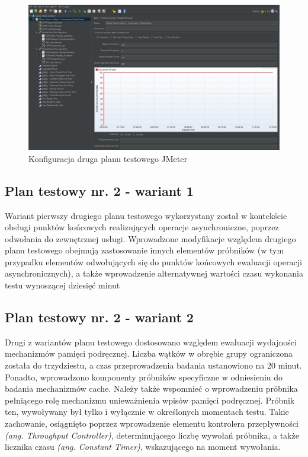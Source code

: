 \begin{figure}[ht]
    \centering
     \includegraphics[width=\linewidth]{rys04/test-plan-2.png}
    \caption{Konfiguracja druga planu testowego JMeter}
    \label{fig:test-plan-2}
\end{figure}

\subsection*{Plan testowy nr. 2 - wariant 1}
\label{plan-testowy-2-wariant-1}
Wariant pierwszy drugiego planu testowego wykorzystany został w kontekście obsługi punktów końcowych realizujących operacje asynchroniczne, poprzez odwołania do zewnętrznej usługi. Wprowadzone modyfikacje względem drugiego planu testowego obejmują zastosowanie innych elementów próbników (w tym przypadku elementów odwołujących się do punktów końcowych ewaluacji operacji asynchronicznych), a także wprowadzenie alternatywnej wartości czasu wykonania testu wynoszącej dziesięć minut

\subsection*{Plan testowy nr. 2 - wariant 2}
\label{plan-testowy-2-wariant-2}
Drugi z wariantów planu testowego dostosowano względem ewaluacji wydajności mechanizmów pamięci podręcznej. Liczba wątków w obrębie grupy ograniczona została do trzydziestu, a czas przeprowadzenia badania ustanowiono na 20 minut. Ponadto, wprowadzono komponenty próbników specyficzne w odniesieniu do badania mechanizmów cache. Należy także wspomnieć o wprowadzeniu próbnika pełniącego rolę mechanizmu unieważnienia wpisów pamięci podręcznej. Próbnik ten, wywoływany był tylko i wyłącznie w określonych momentach testu. Takie zachowanie, osiągnięto poprzez wprowadzenie elementu kontrolera przepływności \textit{(ang. Throughput Controller)}, determinującego liczbę wywołań próbnika, a także licznika czasu \textit{(ang. Constant Timer)}, wskazującego na moment wywołania. 